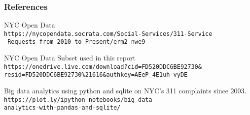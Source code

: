 \documentclass[10pt]{beamer}
\begin{document}
\begin{frame} \frametitle{References}
\begin{thebibliography}{9}
NYC Open Data
\\\texttt{https://nycopendata.socrata.com/Social-Services/311-Service\\-Requests-from-2010-to-Present/erm2-nwe9}

NYC Open Data Subset used in this report
\\\texttt{https://onedrive.live.com/download?cid=FD520DDC6BE92730\&\\resid=FD520DDC6BE92730\%21616\&authkey=AEeP\_4E1uh-vyDE}

Big data analytics using python and sqlite on NYC's 311 complaints since 2003.
\\\texttt{https://plot.ly/ipython-notebooks/big-data-\\analytics-with-pandas-and-sqlite/}

\end{thebibliography}

\end{frame}
\end{document}

